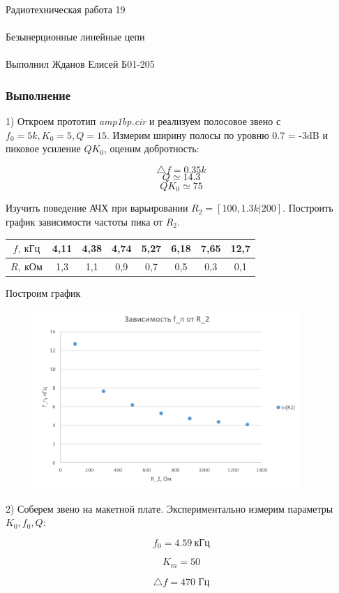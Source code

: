 \documentclass{astroedu-lab}
\begin{document}
\begin{problem}{\huge Радиотехническая работа 19\\\\Безынерционные линейные цепи\\\\Выполнил Жданов Елисей Б01-205}
\subsubsection{Выполнение}

1) Откроем прототип \textit{amp1bp.cir} и реализуем полосовое звено с $f_0 = 5k, K_0 = 5, Q = 15$. Измерим ширину полосы по уровню 0.7 = -3dB и пиковое усиление $QK_0$, оценим добротность:

\[\bigtriangleup f = 0.35k\]
\[Q \simeq 14.3\]
\[QK_0 \simeq 75\]

Изучить поведение АЧХ при варьировании $R_2 = [100, 1.3k|200]$. Построить график зависимости частоты пика от $R_2$.

\begin{center}
\begin{tabular}{|c|c|c|c|c|c|c|c|}
\hline 
$f, \: \text{кГц}$ & 4,11 & 4,38 & 4,74 & 5,27 & 6,18 & 7,65 & 12,7 \\ 
\hline 
$R, \: \text{кОм}$ & 1,3 & 1,1 & 0,9 & 0,7 & 0,5 & 0,3 & 0,1 \\ 
\hline 
\end{tabular} 
\end{center}

Построим график

\begin{figure}[!h]
	\centering
	\includegraphics[width=0.9\textwidth]{ex.png}
	\label{fig:boiler}
\end{figure}

\newpage

2) Соберем звено на макетной плате. Экспериментально измерим параметры $K_0, f_0, Q$:

\[f_0 = 4.59 \: \text{кГц}\]

\[K_m = 50\]

\[\bigtriangleup f = 470 \text{ Гц}\]


\end{problem}
\end{document}
